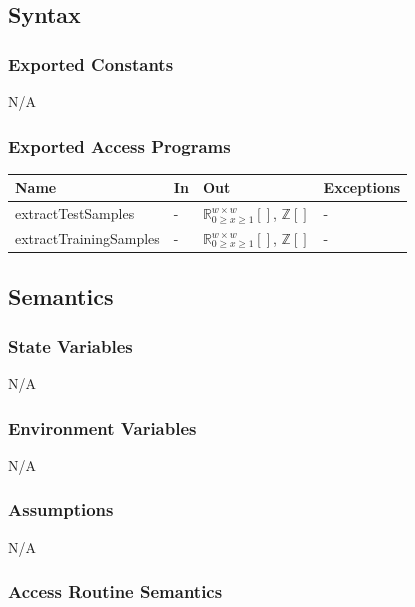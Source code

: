 \documentclass[12pt, titlepage]{article}
\begin{document}
\subsection{Syntax}

\subsubsection{Exported Constants}

N/A

\subsubsection{Exported Access Programs}


\begin{center}
\begin{tabular}{p{5cm} p{2cm} p{4cm} p{2cm}}
\hline
\textbf{Name} & \textbf{In} & \textbf{Out} & \textbf{Exceptions} \\
\hline
extractTestSamples & - & ${\mathbb{R}^{w \times w}_{0 \ge x \ge 1}[]}$, ${\mathbb{Z}[]}$ & - \\
extractTrainingSamples & - & ${\mathbb{R}^{w \times w}_{0 \ge x \ge 1}[]}$, ${\mathbb{Z}[]}$ & - \\
\hline
\end{tabular}
\end{center}

\subsection{Semantics}

\subsubsection{State Variables}

N/A

\subsubsection{Environment Variables}

N/A

\subsubsection{Assumptions}

N/A

\subsubsection{Access Routine Semantics}
\end{document}
